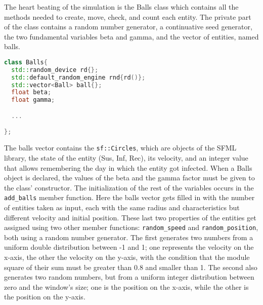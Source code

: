 \documentclass[a4paper, 11pt]{article}
\begin{document}
  The heart beating of the simulation is the Balls class which contains all the methods needed to create, move, check, and count each entity. The private part of the class contains a random number generator, a continuative seed generator, the two fundamental variables beta and gamma, and the vector of entities, named balls.
  \begin{lstlisting}[language=C++, style=code]
class Balls{
  std::random_device rd{};
  std::default_random_engine rnd{rd()};
  std::vector<Ball> ball{};
  float beta;
  float gamma;

  ...

};
  \end{lstlisting}
  The balls vector contains the \verb|sf::Circles|, which are objects of the SFML library, the state of the entity (Sus, Inf, Rec), its velocity, and an integer value that allows remembering the day in which the entity got infected.
  When a Balls object is declared, the values of the beta and the gamma factor must be given to the class' constructor. The initialization of the rest of the variables occurs in the \verb|add_balls| member function. Here the balls vector gets filled in with the number of entities taken as input, each with the same radius and characteristics but different velocity and initial position. These last two properties of the entities get assigned using two other member functions: \verb|random_speed| and \verb|random_position|, both using a random number generator. The first generates two numbers from a uniform double distribution between -1 and 1; one represents the velocity on the x-axis, the other the velocity on the y-axis, with the condition that the module square of their sum must be greater than 0.8 and smaller than 1. The second also generates two random numbers, but from a uniform integer distribution between zero and the window's size; one is the position on the x-axis, while the other is the position on the y-axis.
\end{document}
